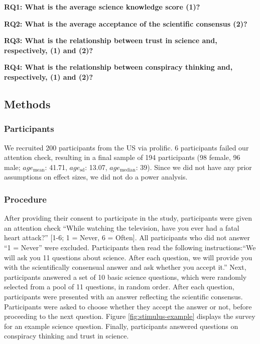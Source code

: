 \documentclass[
  doc,floatsintext]{apa6}
\begin{document}
\textbf{RQ1: What is the average science knowledge score (1)?}

\textbf{RQ2: What is the average acceptance of the scientific consensus (2)?}

\textbf{RQ3: What is the relationship between trust in science and, respectively, (1) and (2)?}

\textbf{RQ4: What is the relationship between conspiracy thinking and, respectively, (1) and (2)?}

\subsection{Methods}\label{methods}

\subsubsection{Participants}\label{participants}

We recruited 200 participants from the US via prolific. 6 participants failed our attention check, resulting in a final sample of 194 participants (98 female, 96 male; \(age_\text{mean}\): 41.71, \(age_\text{sd}\): 13.07, \(age_\text{median}\): 39). Since we did not have any prior assumptions on effect sizes, we did not do a power analysis.

\subsubsection{Procedure}\label{procedure}

After providing their consent to participate in the study, participants were given an attention check ``While watching the television, have you ever had a fatal heart attack?'' {[}1-6; 1 = Never, 6 = Often{]}. All participants who did not answer ``1 = Never'' were excluded. Participants then read the following instructions:``We will ask you 11 questions about science. After each question, we will provide you with the scientifically consensual answer and ask whether you accept it.'' Next, participants answered a set of 10 basic science questions, which were randomly selected from a pool of 11 questions, in random order. After each question, participants were presented with an answer reflecting the scientific consensus. Participants were asked to choose whether they accept the answer or not, before proceeding to the next question. Figure \ref{fig:stimulus-example} displays the survey for an example science question. Finally, participants answered questions on conspiracy thinking and trust in science.
\end{document}
